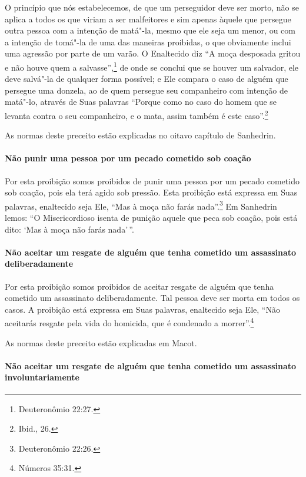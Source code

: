 \begin{multicols}{2}
O princípio que nós estabelecemos, de que um perseguidor deve ser morto,
não se aplica a todos os que viriam a ser malfeitores e sim apenas
àquele que persegue outra pessoa com a intenção de matá"-la, mesmo que
ele seja um menor, ou com a intenção de tomá"-la de uma das maneiras
proibidas, o que obviamente inclui uma agressão por parte de um varão. O
Enaltecido diz ``A moça desposada gritou e não houve quem a salvasse'',\footnote{Deuteronômio 22:27.} de onde se conclui que se houver um salvador, ele
deve salvá"-la de qualquer forma possível; e Ele compara o caso de alguém
que persegue uma donzela, ao de quem persegue seu companheiro com
intenção de matá"-lo, através de Suas palavras ``Porque como no caso do
homem que se levanta contra o seu companheiro, e o mata, assim também é
este caso''.\footnote{Ibid., 26.}

As normas deste preceito estão explicadas no oitavo capítulo de Sanhedrin\starr.

\paragraph{Não punir uma pessoa por um pecado cometido sob coação}

Por esta proibição somos proibidos de punir uma pessoa por um pecado
cometido sob coação, pois ela terá agido sob pressão. Esta proibição
está expressa em Suas palavras, enaltecido seja Ele, ``Mas à moça não
farás nada''.\footnote{Deuteronômio 22:26.} Em Sanhedrin\starr{} lemos: ``O
Misericordioso isenta de punição aquele que peca sob coação, pois está
dito: `Mas à moça não farás nada'\,''.

\paragraph{Não aceitar um resgate de alguém que tenha cometido um assassinato deliberadamente}

Por esta proibição somos proibidos de aceitar resgate de alguém que
tenha cometido um assassinato deliberadamente. Tal pessoa deve ser morta
em todos os casos. A proibição está expressa em Suas palavras, enaltecido
seja Ele, ``Não aceitarás resgate pela vida do homicida, que é condenado
a morrer''.\footnote{Números 35:31.}

As normas deste preceito estão explicadas em Macot\starr.

\paragraph{Não aceitar um resgate de alguém que tenha cometido um assassinato involuntariamente}


\end{multicols}
